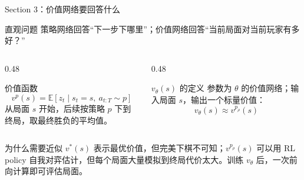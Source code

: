 \documentclass[UTF8,aspectratio=169,10pt]{ctexbeamer}
\begin{document}
\begin{frame}{Section 3：价值网络要回答什么}
  \small
  \begin{block}{直观问题}
    策略网络回答“下一步下哪里”；价值网络回答“当前局面对当前玩家有多好？”
  \end{block}

  \vspace{-0.1cm}
  \begin{columns}[T,onlytextwidth]
    \begin{column}{0.48\textwidth}
      \begin{block}{价值函数}
        \[
          v^p(s)=\mathbb{E}[z_t\mid s_t=s,\ a_{t:T}\sim p]
        \]
        从局面 $s$ 开始，后续按策略 $p$ 下到终局，取最终胜负的平均值。
      \end{block}
    \end{column}
    \begin{column}{0.48\textwidth}
      \begin{block}{$v_{\theta}(s)$ 的定义}
        参数为 $\theta$ 的价值网络；输入局面 $s$，输出一个标量价值：
        \[
          v_{\theta}(s)\approx v^{p_{\rho}}(s)
        \]
      \end{block}
    \end{column}
  \end{columns}

  \begin{alertblock}{为什么需要近似}
    $v^*(s)$ 表示最优价值，但完美下棋不可知；$v^{p_{\rho}}(s)$ 可以用 RL policy 自我对弈估计，但每个局面大量模拟到终局代价太大。训练 $v_{\theta}$ 后，一次前向计算即可评估局面。
  \end{alertblock}
\end{frame}
\end{document}
